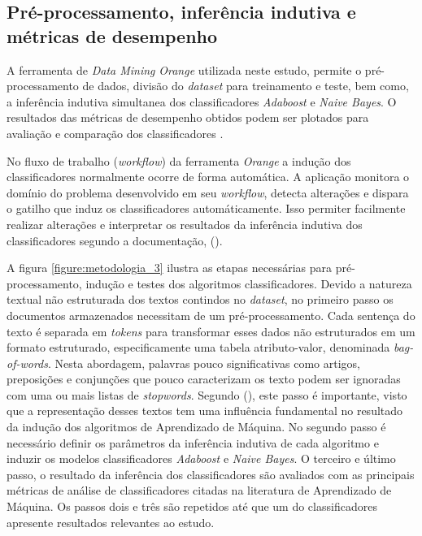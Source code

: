 

\subsection{Pré-processamento, inferência indutiva e métricas de desempenho}
\label{subsection:pre_processamento}

A ferramenta de \textit{Data Mining} \textit{Orange} utilizada neste estudo, 
permite o pré-processamento de dados, divisão do \textit{dataset} para 
treinamento e teste, bem como, a inferência indutiva simultanea dos 
classificadores \textit{Adaboost} e \textit{Naive Bayes}. O resultados das 
métricas de desempenho obtidos podem ser plotados para avaliação e comparação 
dos classificadores \cite{wahbeh2011comparison}.

No fluxo de trabalho (\textit{workflow}) da ferramenta \textit{Orange} a 
indução dos classificadores normalmente ocorre de forma automática. A aplicação
monitora o domínio do problema desenvolvido em seu \textit{workflow}, detecta 
alterações e dispara o gatilho que induz os classificadores automáticamente. 
Isso permiter facilmente realizar alterações e interpretar os resultados da 
inferência indutiva dos classificadores segundo a documentação, 
 (\citeyear{orange_documentation}). 

A figura \ref{figure:metodologia_3} ilustra as etapas necessárias para 
pré-processamento, indução e testes dos algoritmos classificadores. Devido a 
natureza textual não estruturada dos textos contindos no \textit{dataset}, no 
primeiro passo os documentos armazenados necessitam de um pré-processamento. 
Cada sentença do texto é separada em \textit{tokens} para transformar esses 
dados não estruturados em um formato estruturado, especificamente uma tabela 
atributo-valor, denominada \textit{bag-of-words}. Nesta abordagem, palavras 
pouco significativas como artigos, preposições e conjunções que pouco 
caracterizam os texto podem ser ignoradas com uma ou mais listas de 
\textit{stopwords}. Segundo  
(\citeyear{matsubara2003pretext}), este passo é importante, visto que a 
representação desses textos tem uma influência fundamental no resultado da 
indução dos algoritmos de Aprendizado de Máquina. No segundo passo é 
necessário definir os parâmetros da inferência indutiva de cada algoritmo e 
induzir os modelos classificadores \textit{Adaboost} e \textit{Naive Bayes}. 
O terceiro e último passo, o resultado da inferência dos classificadores são 
avaliados com as principais métricas de análise de classificadores citadas na 
literatura de Aprendizado de Máquina. Os passos dois e três são repetidos até 
que um do classificadores apresente resultados relevantes ao estudo.

